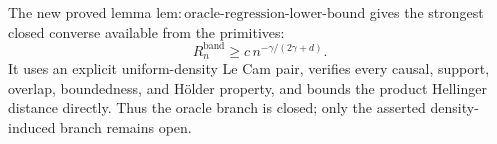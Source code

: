 The new proved lemma \(\mathrm{lem:oracle\mbox{-}regression\mbox{-}lower\mbox{-}bound}\) gives the strongest closed converse available from the primitives:
\[
R_n^{\mathrm{band}}\geq c\,n^{-\gamma/(2\gamma+d)}.
\]
It uses an explicit uniform-density Le Cam pair, verifies every causal, support, overlap, boundedness, and H\"older property, and bounds the product Hellinger distance directly.  Thus the oracle branch is closed; only the asserted density-induced branch remains open.